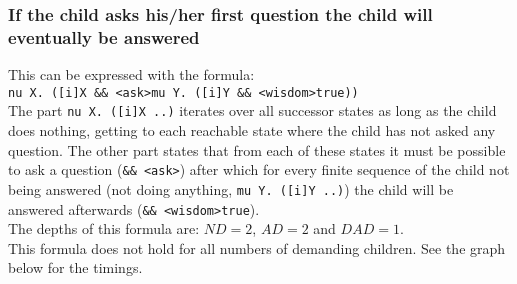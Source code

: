\documentclass[10pt,a4paper]{article}
\begin{document}

\subsubsection{If the child asks his/her first question the child will eventually be answered}
This can be expressed with the formula:\\
{\tt nu X. ([i]X \&\& <ask>mu Y. ([i]Y \&\& <wisdom>true))}\\
The part {\tt nu X. ([i]X ..)} iterates over all successor states as long as the child does nothing, getting to each reachable state where the child has not asked any question. The other part states that from each of these states it must be possible to ask a question ({\tt \&\& <ask>}) after which for every finite sequence of the child not being answered (not doing anything, {\tt mu Y. ([i]Y ..)}) the child will be answered afterwards ({\tt \&\& <wisdom>true}).\\
The depths of this formula are: $ND = 2$, $AD = 2$ and $DAD = 1$.\\
This formula does not hold for all numbers of demanding children. See the graph below for the timings.\\

\end{document}
